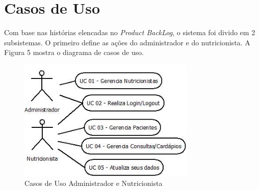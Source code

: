 \documentclass[
	12pt,				%
    oneside,			%
	a4paper,			%
	english,			%
	french,				%
	spanish,			%
	brazil,				%
	]{abntex2}
\begin{document}
\section{Casos de Uso}

Com base nas histórias elencadas no \textit{Product BackLog}, o sistema foi divido em 2
subsistemas. O primeiro define as ações do administrador e do nutricionista. A Figura 5
mostra o diagrama de casos de uso.

\begin{figure} [hbt] 
\begin{center}
\includegraphics[width=0.75\textwidth]{uc1.jpeg}
\end{center}
\label{table1} 
\caption{Casos de Uso Administrador e Nutricionista}
\end{figure}
\end{document}
